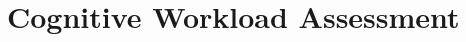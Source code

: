 \documentclass{beamer}
\newenvironment{figure*}%
{\begin{figure}}
{\end{figure}}
\begin{document}
%

\section{Cognitive Workload Assessment}


\end{document}

